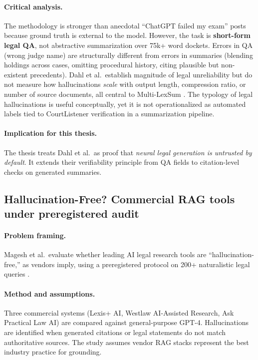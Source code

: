 \paragraph{Critical analysis.}
The methodology is stronger than anecdotal ``ChatGPT failed my exam'' posts because ground truth is external to the model. However, the task is \textbf{short-form legal QA}, not abstractive summarization over 75k+ word dockets. Errors in QA (wrong judge name) are structurally different from errors in summaries (blending holdings across cases, omitting procedural history, citing plausible but non-existent precedents). Dahl et al.\ establish magnitude of legal unreliability but do not measure how hallucinations \emph{scale} with output length, compression ratio, or number of source documents, all central to Multi-LexSum \cite{shen2022multilexsum}. The typology of legal hallucinations is useful conceptually, yet it is not operationalized as automated labels tied to CourtListener verification in a summarization pipeline.

\paragraph{Implication for this thesis.}
The thesis treats Dahl et al.\ as proof that \emph{neural legal generation is untrusted by default}. It extends their verifiability principle from QA fields to citation-level checks on generated summaries.

\subsection{Hallucination-Free? Commercial RAG tools under preregistered audit}
\label{sec:lit-magesh}

\paragraph{Problem framing.}
Magesh et al.\ evaluate whether leading AI legal research tools are ``hallucination-free,'' as vendors imply, using a preregistered protocol on 200+ naturalistic legal queries \cite{magesh2025hallucinationfree}.

\paragraph{Method and assumptions.}
Three commercial systems (Lexis+ AI, Westlaw AI-Assisted Research, Ask Practical Law AI) are compared against general-purpose GPT-4. Hallucinations are identified when generated citations or legal statements do not match authoritative sources. The study assumes vendor RAG stacks represent the best industry practice for grounding.

